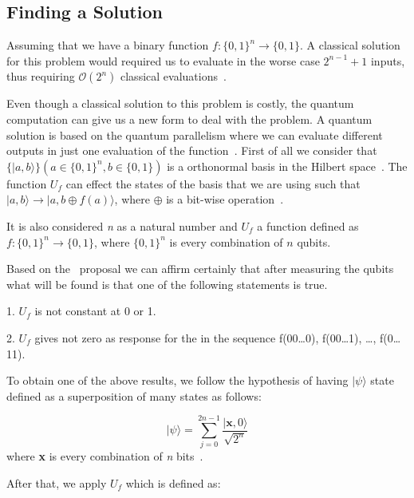 \documentclass[conference]{IEEEtran}
\begin{document}
\subsection{Finding a Solution}\label{subsec:finding-a-solution}

 Assuming that we have a binary function \(f: \{{0,1\}}^n \rightarrow  \{0,1\}\).
 A classical solution for this problem would required us to evaluate in the worse case \(2^{n-1} + 1\)
 inputs, thus requiring \(\mathcal{O}(2^{n})\) classical evaluations~\cite{yanofsky2008quantum,deutsch1992rapid}.

 Even though a classical solution to this problem is costly, the quantum computation can give us a new form to deal with
the problem.
A quantum solution is based on the quantum parallelism where we can evaluate different outputs in just one evaluation of
the function~\cite{deutsch1992rapid}.
 First of all we consider that \(\{{|a,b\rangle\}}(a \in \{{0,1\}}^n, b \in \{0,1\})\) is a orthonormal
 basis in the Hilbert space~\cite{deutsch1992rapid}.
 The function \(U_f\) can effect the states of the
 basis that we are using such that \(|a,b\rangle \rightarrow |a,b \oplus f(a) \rangle\),
 where \(\oplus\) is a bit-wise operation~\cite{deutsch1992rapid}.


 It is also considered \textit{n} as a natural number and \(U_f\) a function defined as
 \(f:\{{0,1\}}^n \rightarrow \{{0,1\}}\), where \(\{{0,1\}}^n\) is every combination of \(n\) qubits.

 Based on the~\cite{deutsch1992rapid} proposal we can affirm certainly that after measuring the qubits
 what will be found is that one of the following statements is true.

 1. \(U_f\) is not constant at 0 or 1.

 2. \(U_f\) gives not zero as response for the in the sequence f(00\dots0), f(00\dots1), \dots, f(0\dots11).

 To obtain one of the above results, we follow the hypothesis of having \(|\psi\rangle\) state defined as a
 superposition of many states as follows:

 \begin{equation}
    |\psi\rangle = \sum_{j=0}^{2n-1} \frac{|\textbf{x},0\rangle}{\sqrt{2^n}}
 \end{equation}
 where \textbf{x} is every combination of \textit{n} bits~\cite{deutsch1992rapid}.

 After that, we apply \(U_f\) which is defined as:
\end{document}
